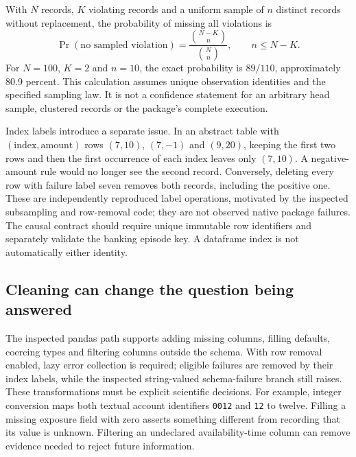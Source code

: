 With $N$ records, $K$ violating records and a uniform sample of $n$ distinct
records without replacement, the probability of missing all violations is
\begin{equation}
 \Pr(\text{no sampled violation})=
 \frac{\binom{N-K}{n}}{\binom{N}{n}},\qquad n\leq N-K.
\end{equation}
For $N=100$, $K=2$ and $n=10$, the exact probability is $89/110$, approximately
80.9 percent. This calculation assumes unique observation identities and the
specified sampling law. It is not a confidence statement for an arbitrary
head sample, clustered records or the package's complete execution.
\citep{exec24_pandera_reference}

Index labels introduce a separate issue. In an abstract table with
$(\text{index},\text{amount})$ rows $(7,10)$, $(7,-1)$ and $(9,20)$,
keeping the first two rows and then the first occurrence of each index leaves
only $(7,10)$. A negative-amount rule would no longer see the second record.
Conversely, deleting every row with failure label seven removes both records,
including the positive one. These are independently reproduced label
operations, motivated by the inspected subsampling and row-removal code;
they are not observed native package failures. The causal contract should
require unique immutable row identifiers and separately validate the banking
episode key. A dataframe index is not automatically either identity.
\citep{exec24_pandera_source,exec24_pandera_reference}

\subsection{Cleaning can change the question being answered}
The inspected pandas path supports adding missing columns, filling defaults,
coercing types and filtering columns outside the schema. With row removal
enabled, lazy error collection is required; eligible failures are removed by
their index labels, while the inspected string-valued schema-failure branch
still raises. These transformations must be explicit scientific decisions.
For example, integer conversion maps both textual account identifiers
\texttt{0012} and \texttt{12} to twelve. Filling a missing exposure field with
zero asserts something different from recording that its value is unknown.
Filtering an undeclared availability-time column can remove evidence needed
to reject future information.~\citep{exec24_pandera_source,exec24_pandera_reference}

